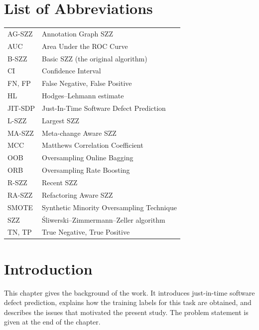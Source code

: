 \documentclass[12pt,a4paper,oneside]{report}
\begin{document}
{\singlespacing
\tableofcontents
\listoffigures
\listoftables
}

\chapter*{List of Abbreviations}

\begin{tabular}{@{}ll@{}}
AG-SZZ & Annotation Graph SZZ \\
AUC & Area Under the ROC Curve \\
B-SZZ & Basic SZZ (the original algorithm) \\
CI & Confidence Interval \\
FN, FP & False Negative, False Positive \\
HL & Hodges--Lehmann estimate \\
JIT-SDP & Just-In-Time Software Defect Prediction \\
L-SZZ & Largest SZZ \\
MA-SZZ & Meta-change Aware SZZ \\
MCC & Matthews Correlation Coefficient \\
OOB & Oversampling Online Bagging \\
ORB & Oversampling Rate Boosting \\
R-SZZ & Recent SZZ \\
RA-SZZ & Refactoring Aware SZZ \\
SMOTE & Synthetic Minority Oversampling Technique \\
SZZ & \'{S}liwerski--Zimmermann--Zeller algorithm \\
TN, TP & True Negative, True Positive \\
\end{tabular}

\clearpage
{}
\setcounter{page}{1}

\chapter{Introduction}\label{ch:intro}

This chapter gives the background of the work. It introduces just-in-time
software defect prediction, explains how the training labels for this task are
obtained, and describes the issues that motivated the present study. The
problem statement is given at the end of the chapter.
\end{document}
